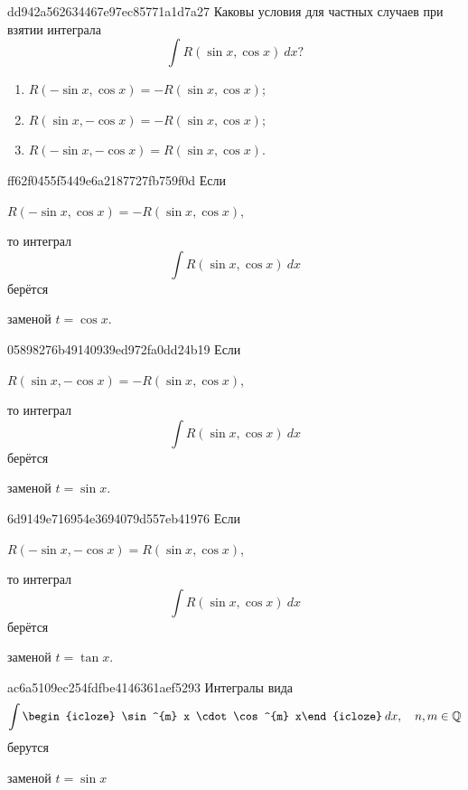 \begin{note}{dd942a562634467e97ec85771a1d7a27}
    Каковы условия для частных случаев при взятии интеграла
    \[
        \int R(\sin x,  \cos x)\: dx?
    \]

    \begin{cloze}{1}
        \begin{enumerate}
            \item \({ R(-\sin x, \cos x) = -R(\sin x, \cos x) }\);
            \item \({ R(\sin x, -\cos x) = -R(\sin x, \cos x) }\);
            \item \({ R(-\sin x, -\cos x) = R(\sin x, \cos x) }\).
        \end{enumerate}
    \end{cloze}
\end{note}

\begin{note}{ff62f0455f5449e6a2187727fb759f0d}
    Если \begin{icloze}{2}\({ R(-\sin x, \cos x) = -R(\sin x, \cos x) }\),\end{icloze} то интеграл
    \[
        \int R(\sin x, \cos x)\: dx
    \]
    берётся \begin{icloze}{1}заменой \({ t = \cos x }\).\end{icloze}
\end{note}

\begin{note}{05898276b49140939ed972fa0dd24b19}
    Если \begin{icloze}{2}\({ R(\sin x, -\cos x) = -R(\sin x, \cos x) }\),\end{icloze} то интеграл
    \[
        \int R(\sin x, \cos x)\: dx
    \]
    берётся \begin{icloze}{1}заменой \({ t = \sin x }\).\end{icloze}
\end{note}

\begin{note}{6d9149e716954e3694079d557eb41976}
    Если \begin{icloze}{2}\({ R(-\sin x, -\cos x) = R(\sin x, \cos x) }\),\end{icloze} то интеграл
    \[
        \int R(\sin x, \cos x)\: dx
    \]
    берётся \begin{icloze}{1}заменой \({ t = \tan x }\).\end{icloze}
\end{note}

\begin{note}{ac6a5109ec254fdfbe4146361aef5293}
    Интегралы вида
    \[
        \int \begin{icloze}{2}\sin^{m} x \cdot \cos^{m} x\end{icloze}\: dx, \quad n, m \in \mathbb Q
    \]
    берутся \begin{icloze}{1}заменой \({ t = \sin x }\)\end{icloze}
\end{note}

